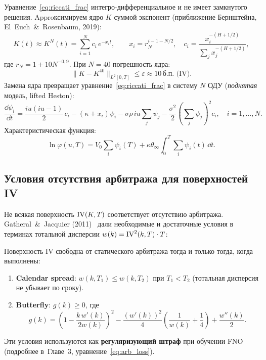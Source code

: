 Уравнение~\eqref{eq:riccati_frac} интегро-дифференциальное и не имеет
замкнутого решения. Approксимируем ядро $K$ суммой экспонент
(приближение Бернштейна, El~Euch~\&~Rosenbaum, 2019):
\[
  K(t) \approx K^N(t) = \sum_{i=1}^N c_i\,e^{-x_i t}, \qquad
  x_i = r_N^{i-1-N/2}, \quad
  c_i = \frac{x_i^{-(H+1/2)}}{\sum_{j} x_j^{-(H+1/2)}},
\]
где $r_N = 1 + 10 N^{-0{,}9}$. При $N = 40$ погрешность ядра:
\[
  \|K - K^{40}\|_{L^2[0,T]} \leq \varepsilon \approx 10\,\text{б.п. (IV)}.
\]
Замена ядра превращает уравнение~\eqref{eq:riccati_frac} в систему $N$ ОДУ
(\textit{поднятая} модель, lifted Heston):
\begin{equation}
  \label{eq:lifted}
  \frac{\dd \psi_i}{\dd t}
  = \frac{iu(iu-1)}{2}\,c_i
    - (\kappa + x_i)\psi_i
    - \sigma\rho\,iu \sum_j \psi_j
    - \frac{\sigma^2}{2}\!\left(\sum_j \psi_j\right)^{\!2}\!c_i, \quad i=1,\ldots,N.
\end{equation}
Характеристическая функция:
\[
  \ln\varphi(u,T) = V_0\!\sum_i \psi_i(T) + \kappa\theta_{\infty}\int_0^T\!\sum_i\psi_i(t)\,\dd t.
\]

\subsection{Условия отсутствия арбитража для поверхностей IV}

Не всякая поверхность $\mathrm{IV}(K,T)$ соответствует отсутствию арбитража.
Gatheral~\&~Jacquier (2011)~\cite{GatheralJacquier2011} дали необходимые и
достаточные условия в терминах тотальной дисперсии $w(k) = \mathrm{IV}^2(k,T)\cdot T$:

\begin{theorem}
  Поверхность IV свободна от статического арбитража тогда и только тогда,
  когда выполнены:
  \begin{enumerate}
    \item \textbf{Calendar spread}: $w(k,T_1) \leq w(k,T_2)$ при $T_1 < T_2$
          (тотальная дисперсия не убывает по сроку).
    \item \textbf{Butterfly}: $g(k) \geq 0$, где
          \[
            g(k) = \left(1 - \frac{k\,w'(k)}{2w(k)}\right)^{\!2}
                   - \frac{(w'(k))^2}{4}\!\left(\frac{1}{w(k)} + \frac{1}{4}\right)
                   + \frac{w''(k)}{2}.
          \]
  \end{enumerate}
\end{theorem}

Эти условия используются как \textbf{регуляризующий штраф} при обучении FNO
(подробнее в~Главе~3, уравнение~\eqref{eq:arb_loss}).

